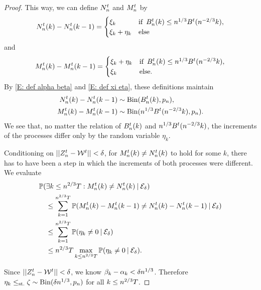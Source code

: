 \begin{proof}
This way, we can define $N_n^t$ and $M_n^t$ by
\begin{equation}
N_n^t(k) - N_n^t(k-1) = 
\begin{cases}
\xi_k & \text{if} \enspace B_n^t(k) \leq n^{1 / 3}B^t(n^{-2 / 3}k), \\
\xi_k + \eta_k &\text{else}
\end{cases}
\end{equation}
and
\begin{equation}
M_n^t(k) - M_n^t(k-1) = 
\begin{cases}
\xi_k + \eta_k & \text{if} \enspace B_n^t(k) \leq n^{1 / 3}B^t(n^{-2 / 3}k), \\
\xi_k &\text{else}.
\end{cases}
\end{equation}
By \eqref{E: def alpha beta} and \eqref{E: def xi eta},
these definitions maintain
\begin{equation*}
\begin{aligned}
N_n^t(k) - N_n^t(k-1) &\sim \operatorname*{Bin}(B_n^t(k), p_n), \\
M_n^t(k) - M_n^t(k-1) &\sim \operatorname*{Bin}(n^{1 / 3} B^t(n^{-2 / 3}k), p_n).
\end{aligned}
\end{equation*}
We see that, no matter the relation of $B_n^t(k)$ and $n^{1 / 3}B^t(n^{-2 / 3}k)$, 
the increments of the processes differ only by the random variable $\eta_k$.

Conditioning on $||Z_n^t - \mathcal{W}^t|| < \delta$, for $M_n^t(k) \neq N_n^t(k)$ to hold for some $k$,
there has to have been a step in which the increments of both processes were different.
We evaluate
\begin{equation} \label{E: Prob eta not 0}
\begin{aligned}
&\mathbb{P}(\exists k\leq n^{2 / 3}T: M_n^t(k) \neq N_n^t(k) \: | \: \mathcal{E}_{\delta}) \\
&\quad \leq \sum_{k=1}^{n^{2 / 3}T} \mathbb{P}( M_n^t(k) - M_n^t(k-1) \neq N_n^t(k) - N_n^t(k-1) \: | \: \mathcal{E}_{\delta}) \\
&\quad \leq \sum_{k=1}^{n^{2 / 3}T} \mathbb{P}( \eta_k \neq 0 \: | \: \mathcal{E}_{\delta}) \\
&\quad \leq n^{2 / 3}T \max_{k \leq n^{2 / 3}T} \mathbb{P}(\eta_k \neq 0 \: | \: \mathcal{E}_{\delta}).
\end{aligned}
\end{equation}

Since $||Z_n^t - \mathcal{W}^t|| < \delta$, we know $\beta_k - \alpha_k < \delta n^{1 / 3}$. Therefore
$\eta_k \leq_{\text{st.}} \zeta \sim \operatorname*{Bin}(\delta n^{1 / 3}, p_n)$ for all $k \leq n^{2 / 3}T$.


\end{proof}

